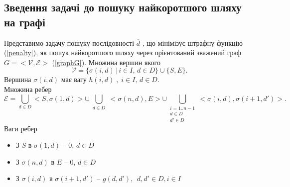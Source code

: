 \subsection{Зведення задачі до пошуку найкоротшого  шляху на графі}\label{G_definition}
Представимо задачу пошуку послідовності $ \overline{d} $ , що мінімізує штрафну функцію (\ref{penalty}), як пошук найкоротшого шляху через орієнтований зважений граф $G = <\mathcal{V}, \mathcal{E}>$ (\ref{graphG}). Множина вершин якого
$$ \mathcal{V} = \{ \sigma(i, d) \, | \, i \in I, \, d \in D \} \cup \{ S, E \}.$$ Вершина $\sigma(i, d)$ має вагу $h(i, d) \;, \; i \in I, \, d \in D .$\\
Множина ребер
$$\mathcal{E} = \bigcup\limits_{d \in D }<S, \sigma(1, d) > \cup \bigcup\limits_{\substack{d \in D}} <\sigma(n, d), E >  \cup \bigcup\limits_{\substack{i = 1..n-1 \\d \in D \\d' \in D}} <\sigma(i, d), \sigma(i+1, d') >.$$
Ваги ребер
\begin{itemize}
\item З $ S $ в $ \sigma(1, d) $ -- $ 0 $, $ d \in D $
\item З $ \sigma(n, d) $ в $ E $ -- $ 0 $, $ d \in D $
\item З $ \sigma(i, d) $ в $\sigma(i + 1, d ') $ -- $ g(d, d') $, $ \; d, d' \in D, i \in I $
\end{itemize}

